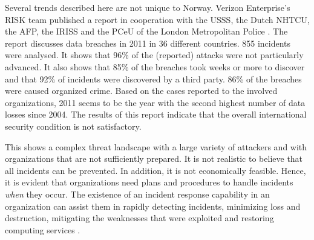 Several trends described here are not unique to Norway. Verizon Enterprise's RISK team published a report in cooperation with the \ac{USSS}, the Dutch \ac{NHTCU}, the \ac{AFP}, the \ac{IRISS} and the \ac{PCeU} of the London Metropolitan Police \cite{VerizonReport}. The report discusses data breaches in 2011 in 36 different countries. 855 incidents were analysed. It shows that 96\% of the (reported) attacks were not particularly advanced. It also shows that 85\% of the breaches took weeks or more to discover and that 92\% of incidents were discovered by a third party. 86\% of the breaches were caused organized crime. Based on the cases reported to the involved organizations, 2011 seems to be the year with the second highest number of data losses since 2004. The results of this report indicate that the overall international security condition is not satisfactory.

This shows a complex threat landscape with a large variety of attackers and with organizations that are not sufficiently prepared. It is not realistic to believe that all incidents can be prevented. In addition, it is not economically feasible. Hence, it is evident that organizations need plans and procedures to handle incidents \textit{when} they occur. The existence of an incident response capability in an organization can assist them in rapidly detecting incidents, minimizing loss and destruction, mitigating the weaknesses that were exploited and restoring computing services \cite{nist800-61}. 